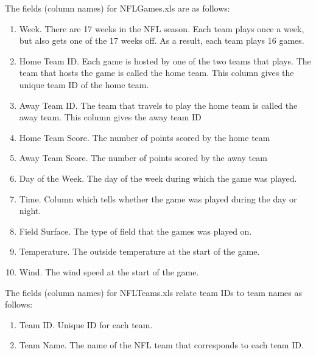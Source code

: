 \documentclass{article}    %
\begin{document}
\medskip
  
\noindent The fields (column names) for NFLGames.xls are as follows:
\begin{enumerate}
\item Week. There are 17 weeks in the NFL season.  Each team plays once a week, but also gets one of the 17 weeks off.  As a result, each team plays 16 games.  
\item Home Team ID.  Each game is hosted by one of the two teams that plays.  The team that hosts the game is called the home team.  This column gives the unique team ID of the home team.
\item Away Team ID. The team that travels to play the home team is called the away team.  This column gives the away team ID
\item Home Team Score. The number of points scored by the home team
\item Away Team Score. The number of points scored by the away team
\item Day of the Week. The day of the week during which the game was played.
\item Time. Column which tells whether the game was played during the day or night.
\item Field Surface. The type of field that the games was played on. 
\item Temperature. The outside temperature at the start of the game.
\item Wind. The wind speed at the start of the game.
\end{enumerate}

\medskip
  
\noindent The fields (column names) for NFLTeams.xls relate team IDs to team names as follows:
\begin{enumerate}
\item Team ID. Unique ID for each team.
\item Team Name.  The name of the NFL team that corresponds to each team ID.
\end{enumerate}
\end{document}

